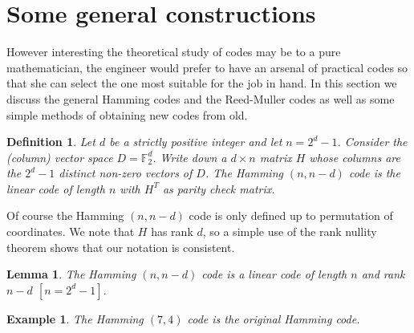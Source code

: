 \documentclass[12pt,a4paper]{article}
\theoremstyle{plain}
\newtheorem{lemma}[theorem]{Lemma}
\newtheorem{definition}[theorem]{Definition}
\newtheorem{example}[theorem]{Example}
\theoremstyle{definition}
\begin{document}
    \section{Some general constructions} However
    interesting the theoretical study of codes may be
    to a pure mathematician,
    the engineer would prefer to have an arsenal
    of practical codes so that she can select
    the one most suitable for the job in hand.
    In this section we discuss the general Hamming
    codes and the Reed-Muller codes as well as some
    simple methods of obtaining new codes from
    old.

    \begin{definition}
        Let $d$ be a strictly
        positive integer and let $n=2^{d}-1$.
        Consider the  (column) vector
        space $D={\mathbb F}_{2}^{d}$. Write down
        a $d\times n$ matrix $H$ whose columns
        are the $2^{d}-1$ distinct non-zero vectors
        of $D$. The Hamming $(n,n-d)$ code is
        the linear code of length $n$ with $H^{T}$
        as parity check matrix.
    \end{definition}

    Of course the Hamming $(n,n-d)$ code is only
    defined up to permutation of coordinates.
    We note that $H$ has rank $d$, so a simple
    use of the rank nullity theorem shows
    that our notation is consistent.
    \begin{lemma}
        The Hamming $(n,n-d)$ code is
        a linear code of length $n$ and rank $n-d$ $[n=2^{d}-1]$.
    \end{lemma}
    \begin{example}
        The Hamming $(7,4)$ code
        is the original Hamming code.
    \end{example}
\end{document}
